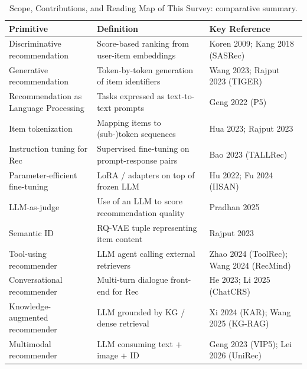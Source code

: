\documentclass{article}
\begin{document}
\begin{table}[t]
\centering
\caption{Scope, Contributions, and Reading Map of This Survey: comparative summary.}
\label{tab:scope-contributions-and-reading-map-of-this-survey}
\begin{tabular}{>{\raggedright\arraybackslash}p{0.2984\linewidth}
  >{\raggedright\arraybackslash}p{0.3790\linewidth}
  >{\raggedright\arraybackslash}p{0.3226\linewidth}}
\toprule
Primitive & Definition & Key Reference \\
\midrule
Discriminative recommendation & Score-based ranking from user-item embeddings & Koren 2009; Kang 2018 (SASRec) \\
Generative recommendation & Token-by-token generation of item identifiers & Wang 2023; Rajput 2023 (TIGER) \\
Recommendation as Language Processing & Tasks expressed as text-to-text prompts & Geng 2022 (P5) \\
Item tokenization & Mapping items to (sub-)token sequences & Hua 2023; Rajput 2023 \\
Instruction tuning for Rec & Supervised fine-tuning on prompt-response pairs & Bao 2023 (TALLRec) \\
Parameter-efficient fine-tuning & LoRA / adapters on top of frozen LLM & Hu 2022; Fu 2024 (IISAN) \\
LLM-as-judge & Use of an LLM to score recommendation quality & Pradhan 2025 \\
Semantic ID & RQ-VAE tuple representing item content & Rajput 2023 \\
Tool-using recommender & LLM agent calling external retrievers & Zhao 2024 (ToolRec); Wang 2024 (RecMind) \\
Conversational recommender & Multi-turn dialogue front-end for Rec & He 2023; Li 2025 (ChatCRS) \\
Knowledge-augmented recommender & LLM grounded by KG / dense retrieval & Xi 2024 (KAR); Wang 2025 (KG-RAG) \\
Multimodal recommender & LLM consuming text + image + ID & Geng 2023 (VIP5); Lei 2026 (UniRec) \\
\end{tabular}
\end{table}
\end{document}
